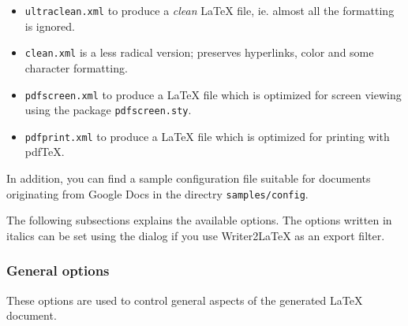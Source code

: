 \documentclass{article}
\newcommand\textstyleSourceText[1]{\texttt{\textmd{#1}}}
\newcommand\liststyleLxi{%
\renewcommand\labelitemi{${\bullet}$}
\renewcommand\labelitemii{${\circ}$}
\renewcommand\labelitemiii{${\blacksquare}$}
\renewcommand\labelitemiv{${\bullet}$}
}
\begin{document}
\liststyleLxi
\begin{itemize}
\item \textstyleSourceText{ultraclean.xml} to produce a \emph{clean} LaTeX file, ie. almost all the formatting is ignored.
\item \textstyleSourceText{clean.xml} is a less radical version; preserves hyperlinks, color and some character formatting.
\item \textstyleSourceText{pdfscreen.xml} to produce a LaTeX file which is optimized for screen viewing using the package \textstyleSourceText{pdfscreen.sty}.
\item \textstyleSourceText{pdfprint.xml} to produce a LaTeX file which is optimized for printing with pdfTeX.
\end{itemize}
{\mdseries
In addition, you can find a sample configuration file suitable for documents originating from Google Docs in the directry \textstyleSourceText{samples/config}.}

{\mdseries
The following subsections explains the available options. The options written in italics can be set using the dialog if you use Writer2LaTeX as an export filter.}

\subsubsection{General options}
{\mdseries
These options are used to control general aspects of the generated LaTeX document.}
\end{document}
